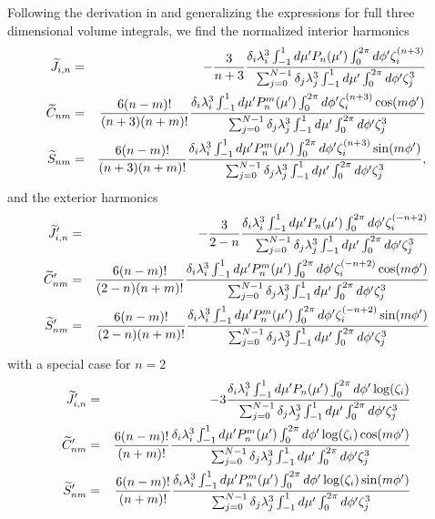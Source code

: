 % 
Following the derivation in \citet{hubbard2013} and generalizing the expressions for
full three dimensional volume integrals, we find the normalized interior harmonics
%
\begin{equation} \begin{aligned} \widetilde{J}_{i,n} &=& -\frac{3}{n+3} \frac{ \delta_i
            \lambda_i^3 \int_{-1}^1 d\mu' P_n(\mu') \int_{0}^{2\pi} d\phi' \zeta_i^{(n+3)} } { \sum_{j=0}^{N-1}
        \delta_j \lambda_j^3 \int_{-1}^1 d\mu' \int_{0}^{2\pi} d\phi' \zeta_j^3} \\ \widetilde{C}_{nm} &=&
        \frac{6(n-m)!}{(n+3)(n+m)!} \frac{ \delta_i \lambda_i^3 \int_{-1}^1 d\mu' P_n^m(\mu')
            \int_{0}^{2\pi} d\phi' \zeta_i^{(n+3)} \cos(m\phi') } { \sum_{j=0}^{N-1} \delta_j
        \lambda_j^3 \int_{-1}^1 d\mu' \int_{0}^{2\pi} d\phi' \zeta_j^3} \\ \widetilde{S}_{nm} &=&
        \frac{6(n-m)!}{(n+3)(n+m)!} \frac{ \delta_i \lambda_i^3 \int_{-1}^1 d\mu' P_n^m(\mu')
            \int_{0}^{2\pi} d\phi' \zeta_i^{(n+3)} \sin(m\phi') } { \sum_{j=0}^{N-1} \delta_j
        \lambda_j^3 \int_{-1}^1 d\mu' \int_{0}^{2\pi} d\phi' \zeta_j^3}, \\ \end{aligned} \label{eq:harmonics}
\end{equation}
%
and the exterior harmonics
%
\begin{equation} \begin{aligned} \widetilde{J}'_{i,n} &=& -\frac{3}{2-n} \frac{ \delta_i
            \lambda_i^3 \int_{-1}^1 d\mu' P_n(\mu') \int_{0}^{2\pi} d\phi' \zeta_i^{(-n+2)} } {
                \sum_{j=0}^{N-1} \delta_j \lambda_j^3 \int_{-1}^1 d\mu' \int_{0}^{2\pi} d\phi' \zeta_j^3} \\
                \widetilde{C}'_{nm} &=&  \frac{6(n-m)!}{(2-n)(n+m)!} \frac{ \delta_i
                    \lambda_i^3 \int_{-1}^1 d\mu' P_n^m(\mu') \int_{0}^{2\pi} d\phi' \zeta_i^{(-n+2)}
                \cos(m\phi') } { \sum_{j=0}^{N-1} \delta_j \lambda_j^3 \int_{-1}^1 d\mu' \int_{0}^{2\pi} d\phi'
            \zeta_j^3} \\ \widetilde{S}'_{nm} &=& \frac{6(n-m)!}{(2-n)(n+m)!} \frac{
                \delta_i \lambda_i^3 \int_{-1}^1 d\mu' P_n^m(\mu') \int_{0}^{2\pi} d\phi'  \zeta_i^{(-n+2)}
            \sin(m\phi') } { \sum_{j=0}^{N-1} \delta_j \lambda_j^3 \int_{-1}^1 d\mu' \int_{0}^{2\pi} d\phi'
        \zeta_j^3} \\ \end{aligned} \label{eq:harmonics_prime} \end{equation}
%
with a special case for $n=2$
%
\begin{equation} \begin{aligned} \widetilde{J}'_{i,n} &=& -3 \frac{ \delta_i \lambda_i^3
        \int_{-1}^1 d\mu' P_n(\mu') \int_{0}^{2\pi} d\phi' \log(\zeta_i) } { \sum_{j=0}^{N-1} \delta_j
    \lambda_j^3 \int_{-1}^1 d\mu' \int_{0}^{2\pi} d\phi' \zeta_j^3} \\ \widetilde{C}'_{nm} &=&
    \frac{6(n-m)!}{(n+m)!} \frac{ \delta_i \lambda_i^3 \int_{-1}^1 d\mu' P_n^m(\mu') \int_{0}^{2\pi} d\phi'
    \log(\zeta_i) \cos(m\phi') } { \sum_{j=0}^{N-1} \delta_j \lambda_j^3 \int_{-1}^1 d\mu'
\int_{0}^{2\pi} d\phi' \zeta_j^3} \\ \widetilde{S}'_{nm} &=& \frac{6(n-m)!}{(n+m)!} \frac{ \delta_i
\lambda_i^3 \int_{-1}^1 d\mu' P_n^m(\mu') \int_{0}^{2\pi} d\phi'  \log(\zeta_i) \sin(m\phi') } {
    \sum_{j=0}^{N-1} \delta_j \lambda_j^3 \int_{-1}^1 d\mu' \int_{0}^{2\pi} d\phi' \zeta_j^3} \\ \end{aligned}
\label{eq:harmonics_prime_n=2} \end{equation}
